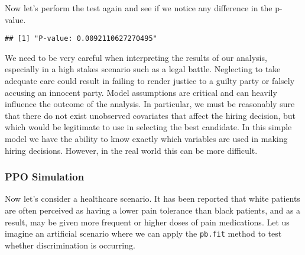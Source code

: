 \documentclass[
]{article}
\newenvironment{Shaded}{\begin{snugshade}}{\end{snugshade}}
\newcommand{\AttributeTok}[1]{\textcolor[rgb]{0.77,0.63,0.00}{#1}}
\newcommand{\CommentTok}[1]{\textcolor[rgb]{0.56,0.35,0.01}{\textit{#1}}}
\newcommand{\ConstantTok}[1]{\textcolor[rgb]{0.00,0.00,0.00}{#1}}
\newcommand{\DecValTok}[1]{\textcolor[rgb]{0.00,0.00,0.81}{#1}}
\newcommand{\FunctionTok}[1]{\textcolor[rgb]{0.00,0.00,0.00}{#1}}
\newcommand{\NormalTok}[1]{#1}
\newcommand{\OtherTok}[1]{\textcolor[rgb]{0.56,0.35,0.01}{#1}}
\newcommand{\SpecialCharTok}[1]{\textcolor[rgb]{0.00,0.00,0.00}{#1}}
\newcommand{\StringTok}[1]{\textcolor[rgb]{0.31,0.60,0.02}{#1}}
\begin{document}
Now let's perform the test again and see if we notice any difference in
the p-value.

\begin{Shaded}
\end{Shaded}

\begin{verbatim}
## [1] "P-value: 0.0092110627270495"
\end{verbatim}

We need to be very careful when interpreting the results of our
analysis, especially in a high stakes scenario such as a legal battle.
Neglecting to take adequate care could result in failing to render
justice to a guilty party or falsely accusing an innocent party. Model
assumptions are critical and can heavily influence the outcome of the
analysis. In particular, we must be reasonably sure that there do not
exist unobserved covariates that affect the hiring decision, but which
would be legitimate to use in selecting the best candidate. In this
simple model we have the ability to know exactly which variables are
used in making hiring decisions. However, in the real world this can be
more difficult.

\hypertarget{ppo-simulation}{%
\subsubsection{PPO Simulation}\label{ppo-simulation}}

Now let's consider a healthcare scenario. It has been reported that
white patients are often perceived as having a lower pain tolerance than
black patients, and as a result, may be given more frequent or higher
doses of pain medications. Let us imagine an artificial scenario where
we can apply the \texttt{pb.fit} method to test whether discrimination
is occurring.
\end{document}
